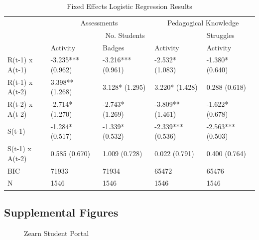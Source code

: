 \documentclass[
  number,
  preprint,
  3p,
  onecolumn]{elsarticle}
\begin{document}
\begin{longtable}{l|llll}

\caption{\label{tbl-fe-results}State-Based Panel Logistic Regression
Results}

\tabularnewline

\caption*{
{\large Fixed Effects Logistic Regression Results}
} \\ 
\toprule
\multicolumn{1}{l}{} & \multicolumn{2}{c}{Assessments} & \multicolumn{2}{c}{Pedagogical Knowledge} \\ 
\cmidrule(lr){2-3} \cmidrule(lr){4-5}
\multicolumn{1}{l}{} & \multicolumn{3}{c}{No. Students} & Struggles \\ 
\cmidrule(lr){2-4} \cmidrule(lr){5-5}
\multicolumn{1}{l}{} & Activity & Badges & Activity & Activity \\ 
\midrule\addlinespace[2.5pt]
R(t-1) x 
 A(t-1) & -3.235***
(0.962) & -3.216***
(0.961) & -2.532*
(1.083) & -1.380*
(0.640) \\ 
R(t-1) x 
 A(t-2) & 3.398**
(1.268) & 3.128*
(1.295) & 3.220*
(1.428) & 0.288
(0.618) \\ 
R(t-2) x 
 A(t-2) & -2.714*
(1.270) & -2.743*
(1.269) & -3.809**
(1.461) & -1.622*
(0.678) \\ 
S(t-1) & -1.284*
(0.517) & -1.339*
(0.532) & -2.339***
(0.536) & -2.563***
(0.503) \\ 
S(t-1) x 
 A(t-2) & 0.585
(0.670) & 1.009
(0.728) & 0.022
(0.791) & 0.400
(0.764) \\ 
BIC & 71933 & 71934 & 65472 & 65476 \\ 
N & 1546 & 1546 & 1546 & 1546 \\ 
\bottomrule

\end{longtable}

\subsection{Supplemental Figures}\label{sec-supp-fig}

\begin{figure}


\caption{\label{fig-st-portal}Zearn Student Portal}

\end{figure}%
\end{document}
